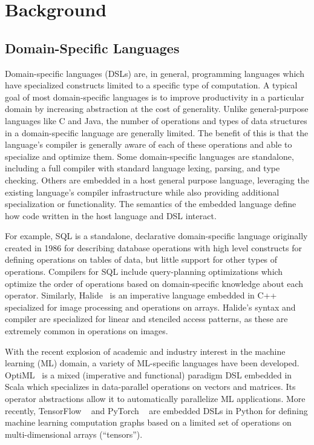 \chapter{Background}
\label{background}

\section{Domain-Specific Languages}
Domain-specific languages (DSLs) are, in general, programming languages which have specialized
constructs limited to a specific type of computation. A typical goal of
most domain-specific languages is to improve productivity in a particular domain
by increasing abstraction at the cost of generality. Unlike general-purpose languages like C and Java,
the number of operations and types of data structures in a domain-specific language
are generally limited. The benefit of this is that the language's compiler is
generally aware of each of these operations and able to specialize and optimize them.
Some domain-specific languages are standalone, including a full compiler with standard language
lexing, parsing, and type checking. Others are embedded in a host general purpose language,
leveraging the existing language's compiler infrastructure while also
providing additional specialization or functionality. The semantics of the embedded language
define how code written in the host language and DSL interact.

For example, SQL is a standalone, declarative
domain-specific language originally created in 1986 for describing database operations with high level constructs
for defining operations on tables of data, but little support for other types of operations.
Compilers for SQL include query-planning optimizations which optimize the order of
operations based on domain-specific knowledge about each operator.
Similarly, Halide~\cite{pldi13halide} is an imperative language embedded in C++ specialized for image processing
and operations on arrays. Halide's syntax and compiler are specialized for linear and stenciled access patterns,
as these are extremely common in operations on images.

With the recent explosion of academic and industry interest in the machine learning (ML) domain,
a variety of ML-specific languages have been developed.
OptiML~\cite{optiml} is a mixed (imperative and functional) paradigm DSL embedded in Scala
which specializes in data-parallel operations on vectors and matrices.
Its operator abstractions allow it to automatically parallelize ML applications.
More recently, TensorFlow ~\cite{tensorflow} and PyTorch ~\cite{pytorch} are
embedded DSLs in Python for defining machine learning computation graphs based on
a limited set of operations on multi-dimensional arrays (``tensors'').

